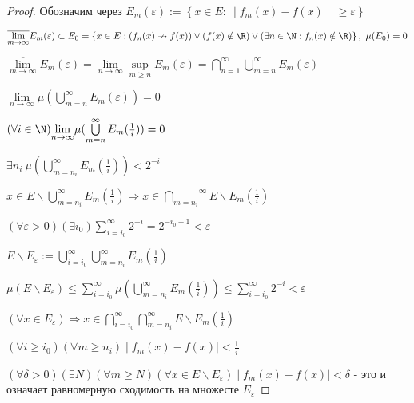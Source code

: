 \begin{proof}
Обозначим через $E_m(\varepsilon):=\left\{x\in E:\ \mid f_m(x)-f(x)\mid\ \geqslant \varepsilon \right\}$

$\overline{\lim\limits_{m\to\infty}}E_m(\varepsilon) \subset E_0=\left\{x\in E:(f_n(x)\nrightarrow f(x)) \vee (f(x) \notin \R) \vee (\exists n\in \N:f_n(x)\notin \R) \right\},\ \mu(E_0)=0$

$\overline{\lim\limits_{m\to\infty}}E_m(\varepsilon) =\lim\limits_{n\to\infty}\sup\limits_{m\geqslant n} E_m(\varepsilon)=\bigcap\limits_{n=1}^{\infty}\bigcup\limits_{m=n}^{\infty}E_m(\varepsilon)$

$\lim\limits_{n\to\infty}\mu(\bigcup\limits_{m=n}^{\infty}E_m(\varepsilon))=0$

$(\forall i \in \N) {\lim\limits_{n\to\infty}} \mu(\bigcup\limits_{m=n}^{\infty}E_m(\frac{1}{i}))=0$

$\exists n_i\ \mu(\bigcup\limits_{m=n_i}^{\infty}E_m(\frac{1}{i}))<2^{-i}$

$x \in E \backslash {\bigcup\limits_{m=n_i}^\infty}E_m(\frac{1}{i}) \Rightarrow x \in \overset{\infty}{\underset{m=n_i}{\bigcap}}E\backslash E_m(\frac{1}{i})$

$(\forall \varepsilon >0)(\exists i_0) \sum\limits_{i=i_0}^{\infty}2^{-i}=2^{-i_0+1}<\varepsilon$

$E\backslash E_{\varepsilon}:=\bigcup\limits_{i=i_0}^{\infty}\bigcup\limits_{m=n_i}^{\infty}E_m(\frac{1}{i})$

$\mu(E\backslash E_{\varepsilon})\leqslant \sum\limits_{i=i_0}^{\infty}\mu(\bigcup\limits_{m=n_i}^{\infty}E_m(\frac{1}{i}))\leqslant \sum\limits_{i=i_0}^{\infty}2^{-i}<\varepsilon$

$(\forall x \in E_{\varepsilon}) \Rightarrow x \in \bigcap\limits_{i=i_0}^{\infty}\bigcap\limits_{m=n_i}^{\infty}E\backslash E_m (\frac{1}{i})$

$(\forall i \geqslant i_0)(\forall m \geqslant n_i) \mid f_m(x)-f(x) \mid < \frac{1}{i}$

$(\forall \delta > 0)(\exists N)(\forall m \geqslant N)(\forall x \in E \backslash E_{\varepsilon}) \mid f_m(x)-f(x) \mid < \delta$ - это и означает равномерную сходимость на множесте $E_{\varepsilon}$
\end{proof}

